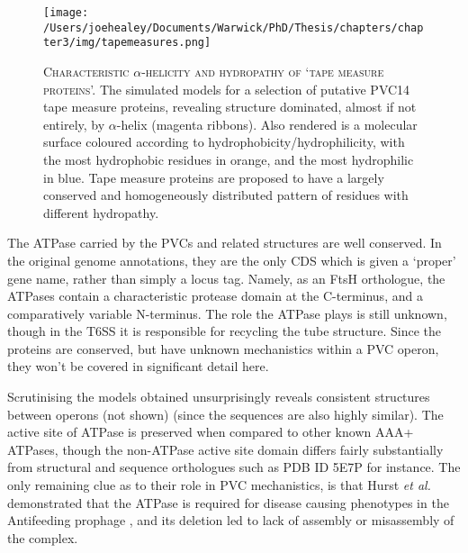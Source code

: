 \begin{figure}[h]
 \thispagestyle{IHA-fancy-style}
 \centering
   \texttt{[image: /Users/joehealey/Documents/Warwick/PhD/Thesis/chapters/chapter3/img/tapemeasures.png]}
 \captionsetup{singlelinecheck=off, justification=justified, font=footnotesize, aboveskip=10pt}
 \caption[Conservation mapping off putative tail fibre structures]{\textsc{\normalsize Characteristic $\alpha$-helicity and hydropathy of `tape measure proteins'.}\vspace{0.1cm} \newline The simulated models for a selection of putative PVC14 tape measure proteins, revealing structure dominated, almost if not entirely, by $\alpha$-helix (magenta ribbons). Also rendered is a molecular surface coloured according to hydrophobicity/hydrophilicity, with the most hydrophobic residues in orange, and the most hydrophilic in blue. Tape measure proteins are proposed to have a largely conserved and homogeneously distributed pattern of residues with different hydropathy.}
 \label{tapemeasures}
\end{figure}

\clearpage
{}
The ATPase carried by the PVCs and related structures are well conserved. In the original genome annotations, they are the only CDS which is given a `proper' gene name, rather than simply a locus tag. Namely, as an FtsH orthologue, the ATPases contain a characteristic protease domain at the C-terminus, and a comparatively variable N-terminus. The role the ATPase plays is still unknown, though in the T6SS it is responsible for recycling the tube structure. Since the proteins are conserved, but have unknown mechanistics within a PVC operon, they won't be covered in significant detail here.

Scrutinising the models obtained unsurprisingly reveals consistent structures between operons (not shown) (since the sequences are also highly similar). The active site of ATPase is preserved when compared to other known AAA+ ATPases, though the non-ATPase active site domain differs fairly substantially from structural and sequence orthologues such as PDB ID 5E7P for instance. The only remaining clue as to their role in PVC mechanistics, is that Hurst \emph{et al.} demonstrated that the ATPase is required for disease causing phenotypes in the Antifeeding prophage \citep{Hurst2004, Rybakova2013}, and its deletion led to lack of assembly or misassembly of the complex.


